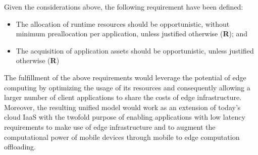 \noindent Given the considerations above, 
the following requirement have been defined:

\begin{itemize}

	\item The allocation of runtime resources should be opportunistic, without minimum preallocation per application, unless justified otherwise (\textbf{R}); and
	
	\item The acquisition of application assets should be opportunistic, unless justified otherwise (\textbf{R})

\end{itemize} 

The fulfillment of the above requirements would leverage the potential of edge computing by optimizing the usage of its resources and consequently allowing a larger number of client applications to share the costs of edge infrastructure. Moreover, the resulting unified model would work as an extension of today’s cloud IaaS with the twofold purpose of enabling applications with low latency requirements to make use of edge infrastructure and to augment the computational power of mobile devices through mobile to edge computation offloading. 